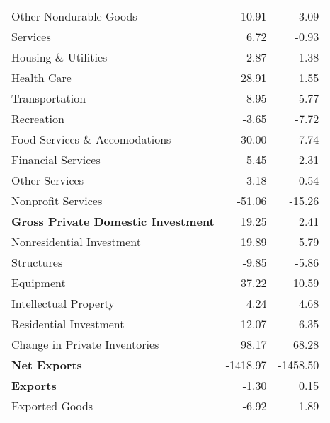 \documentclass[11pt, letterpaper]{article}\usepackage[]{graphicx}\usepackage[]{color}
\begin{document}
\begin{table}[H]
\begin{tabular}{lrr}
  \hspace{24mm}  Other Nondurable Goods & 10.91 & 3.09 \\ 
  \hspace{8mm}  Services & 6.72 & -0.93 \\ 
  \hspace{16mm}  Housing \& Utilities & 2.87 & 1.38 \\ 
  \hspace{16mm}  Health Care & 28.91 & 1.55 \\ 
  \hspace{16mm}  Transportation & 8.95 & -5.77 \\ 
  \hspace{16mm}  Recreation & -3.65 & -7.72 \\ 
  \hspace{16mm}  Food Services \& Accomodations & 30.00 & -7.74 \\ 
  \hspace{16mm}  Financial Services & 5.45 & 2.31 \\ 
  \hspace{16mm}  Other Services & -3.18 & -0.54 \\ 
  \hspace{16mm}  Nonprofit Services & -51.06 & -15.26 \\ 
  \hspace{0mm} \textbf{Gross Private Domestic Investment} & 19.25 & 2.41 \\ 
  \hspace{8mm}  Nonresidential Investment & 19.89 & 5.79 \\ 
  \hspace{16mm}  Structures & -9.85 & -5.86 \\ 
  \hspace{16mm}  Equipment & 37.22 & 10.59 \\ 
  \hspace{16mm}  Intellectual Property & 4.24 & 4.68 \\ 
  \hspace{8mm}  Residential Investment & 12.07 & 6.35 \\ 
  \hspace{8mm}  Change in Private Inventories & 98.17 & 68.28 \\ 
  \hspace{0mm} \textbf{Net Exports} & -1418.97 & -1458.50 \\ 
  \hspace{0mm} \textbf{Exports} & -1.30 & 0.15 \\ 
  \hspace{8mm}  Exported Goods & -6.92 & 1.89 \\ 

\end{tabular}
\end{table}
\end{document}
